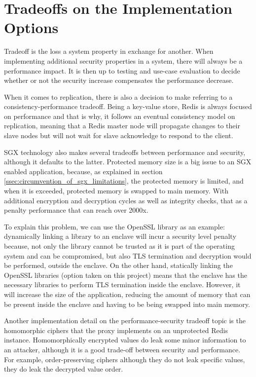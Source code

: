 \section{Tradeoffs on the Implementation Options}
\label{sec:tradeoffs_implementation_options}

Tradeoff is the loss a system property in exchange for another. When implementing additional security properties in a system, there will always be a performance impact. It is then up to testing and use-case evaluation to decide whether or not the security increase compensates the performance decrease.

When it comes to replication, there is also a decision to make referring to a consistency-performance tradeoff. Being a key-value store, Redis is always focused on performance and that is why, it follows an eventual consistency model on replication, meaning that a Redis master node will propagate changes to their slave nodes but will not wait for slave acknowledge to respond to the client.

\gls{SGX} technology also makes several tradeoffs between performance and security, although it defaults to the latter. Protected memory size is a big issue to an \gls{SGX} enabled application, because, as explained in section \ref{ssec:circumvention_of_sgx_limitations}, the protected memory is limited, and when it is exceeded, protected memory is swapped to main memory. With additional encryption and decryption cycles as well as integrity checks, that as a penalty performance that can reach over 2000x. 

To explain this problem, we can use the OpenSSL library as an example: dynamically linking a library to an enclave will incur a security level penalty because, not only the library cannot be trusted as it is part of the operating system and can be compromised, but also \gls{TLS} termination and decryption would be performed, outside the enclave. On the other hand, statically linking the OpenSSL libraries (option taken on this project) means that the enclave has the necessary libraries to perform \gls{TLS} termination inside the enclave. However, it will increase the size of the application, reducing the amount of memory that can be present inside the enclave and having to be being swapped into main memory.

Another implementation detail on the performance-security tradeoff topic is the homomorphic ciphers that the proxy implements on an unprotected Redis instance. Homomorphically encrypted values do leak some minor information to an attacker, although it is a good trade-off between security and performance. For example, order-preserving ciphers although they do not leak specific values, they do leak the decrypted value order.

